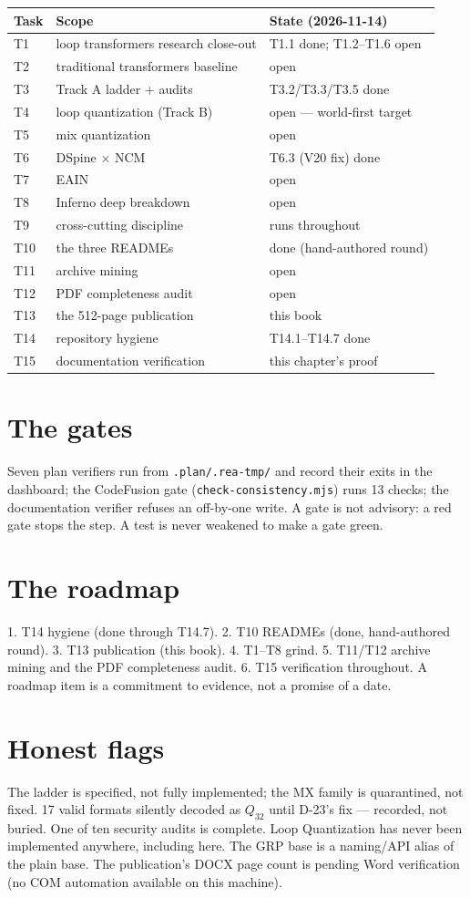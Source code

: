 \begin{tabular}{@{}lll@{}}
\toprule
Task & Scope & State (2026-11-14)\\
\midrule
T1 & loop transformers research close-out & T1.1 done; T1.2--T1.6 open\\
T2 & traditional transformers baseline & open\\
T3 & Track A ladder + audits & T3.2/T3.3/T3.5 done\\
T4 & loop quantization (Track B) & open --- world-first target\\
T5 & mix quantization & open\\
T6 & DSpine $\times$ NCM & T6.3 (V20 fix) done\\
T7 & EAIN & open\\
T8 & Inferno deep breakdown & open\\
T9 & cross-cutting discipline & runs throughout\\
T10 & the three READMEs & done (hand-authored round)\\
T11 & archive mining & open\\
T12 & PDF completeness audit & open\\
T13 & the 512-page publication & this book\\
T14 & repository hygiene & T14.1--T14.7 done\\
T15 & documentation verification & this chapter's proof\\
\bottomrule
\end{tabular}

\section{The gates}

Seven plan verifiers run from \texttt{.plan/.rea-tmp/} and record their exits in the dashboard;
the CodeFusion gate (\texttt{check-consistency.mjs}) runs 13 checks; the documentation
verifier refuses an off-by-one write. A gate is not advisory: a red gate stops the step. A test
is never weakened to make a gate green.

\section{The roadmap}

1. T14 hygiene (done through T14.7). 2. T10 READMEs (done, hand-authored round). 3. T13
publication (this book). 4. T1--T8 grind. 5. T11/T12 archive mining and the PDF completeness
audit. 6. T15 verification throughout. A roadmap item is a commitment to evidence, not a
promise of a date.

\section{Honest flags}

The ladder is specified, not fully implemented; the MX family is quarantined, not fixed. 17
valid formats silently decoded as $Q_{32}$ until D-23's fix --- recorded, not buried. One of
ten security audits is complete. Loop Quantization has never been implemented anywhere,
including here. The GRP base is a naming/API alias of the plain base. The publication's DOCX
page count is pending Word verification (no COM automation available on this machine).
